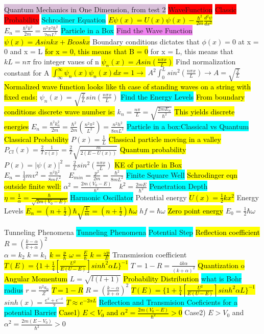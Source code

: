 \documentclass[6pt, oneside]{article}   	%
\begin{document}
\colorbox{Thistle}{Quantum Mechanics in One Dimension, from test 2}
\colorbox{Red}{WaveFunction}
\colorbox{Red}{Classic Probability}
\colorbox{Cyan}{Schrodiner Equation}
\hl{$E\psi(x) = U(x)\psi(x) - \frac{\hbar^2}{2m}\frac{d^2\psi}{dx^2}$}
$E_n = \frac{\hbar^2k^2}{2m} = \frac{n^2\pi^2\hbar^2}{2mL^2}$
\colorbox{Cyan}{Particle in a Box}
\colorbox{Violet}{Find the Wave Function}
\hl{$\psi(x) = Asinkx + B coskx$}
Boundary conditions dictates that $\phi(x) = 0$ at x = 0 and x = L
\hl{for x = 0, this means that B = 0}
for x = L, this means that $kL = n\pi$ fro integer vaues of n
\hl{$\psi_n(x) = A sin(\frac{n\pi x}{L})$}
Find normalization constant for A
\hl{$\int_{\infty}^{\infty} \psi_n(x)\psi_n(x)  dx = 1 \rightarrow $}
$A^2 \int_{0}^{L}  sin^2(\frac{n\pi x}{L}) \rightarrow A = \sqrt{\frac{2}{L}}$
\hl{Normalized wave function looks like th case of standing waves on a string with fixed ends:}
$\psi_n(x) = \sqrt{\frac{2}{L}} sin(\frac{n\pi x}{L})$
\colorbox{Cyan}{Find the Energy Levels}
\hl{From  boundary conditions discrete wave number is:}
$k_n = \frac{n\pi}{L}=\sqrt{\frac{2mE_n}{\hbar^2}}$
\hl{This yields discrete energies}
$E_n= \frac{\hbar^2 k_n^2}{2m} = \frac{\hbar^2}{2m}(\frac{n^2\pi^2}{L^2})=\frac{n^2h^2}{8mL^2}$
\colorbox{Cyan}{Particle in a box:Classical vs Quantum}
\hl{Classical Probability}
$P(x)=\frac{1}{L}$
\hl{Classical particle moving in a valley}
$P_{Cl}(x) = \frac{2}{T}\frac{1}{v(x)}=\frac{2}{T}\sqrt{\frac{m}{2(E-U(x))}}$
\hl{Quantum probability}
$P(x) = |\psi(x)|^2 = \frac{2}{L}sin^2(\frac{n\pi x}{L})$
\hl{KE of particle in Box}
$E_n = \frac{1}{2}mv^2 = \frac{n^2h^2}{8mL^2} \quad E_{min} = \frac{p^2}{2m} = \frac{\hbar^2}{8mL^2}$
\colorbox{Cyan}{Finite Square Well}
\hl{Schrodinger eqn outside finite well:}
$\alpha^2 = \frac{2m(V_0 - E)}{\hbar^2} \quad k^2 = \frac{2mE}{\hbar^2}$
\colorbox{Cyan}{Penetration Depth}
\hl{$\eta = \frac{1}{\alpha} = \frac{\hbar}{\sqrt{2m(V_0 - E)}}$}
\colorbox{Cyan}{Harmonic Oscillator}
Potential energy
\hl{$U(x) = \frac{1}{2}kx^2$}
Energy Levels
\hl{$E_n = (n+\frac{1}{2})\hbar \sqrt{\frac{k}{m}} = (n+\frac{1}{2})\hbar \omega$}
$hf = \hbar\omega$
\hl{Zero point energy}
$E_0 = \frac{1}{2}\hbar \omega$

\colorbox{BurntOrange}{Tunneling Phenomena}
\colorbox{Cyan}{Tunneling Phenomena}
\colorbox{Cyan}{Potential Step}
\hl{Reflection coefficient }
$R = (\frac{k-\alpha}{k+\alpha})^2$\\ $\alpha = k_2$ $k = k_1$
\hl{$k = \frac{p}{\hbar}$  $\omega = \frac{E}{\hbar}$ $k=\frac{\omega p}{E}$}
Transmission coefficient
\hl{$T(E)=\{1+\frac{1}{4}[\frac{U^2}{E(U-E)}]sinh^2\alpha L \}^{-1}$}
$T = 1-R = \frac{4k\alpha}{(k+\alpha)^2}$
\hl{Quantization o Angular Momentum}
$L=\sqrt{l(l+1)}$
\hl{Probability Distribution}
\colorbox{Cyan}{what is Bohr radius}
$r = \frac{n^2 a_0}{Z}$
\hl{$T = 1 - R$}
$R = (\frac{k-\alpha}{k+\alpha})^2$
\hl{$T(E)=\{1+\frac{1}{4}[\frac{U^2}{E(U-E)}]sinh^2\alpha L \}^{-1}$}
$sinh (x) = \frac{e^{x} + e^{-x}}{2}$
\hl{$T \approx e^{-2\alpha L}$}
\colorbox{Cyan}{Reflection and Transmision Coeficients for a potential Barrier}
\hl{Case1) $E<V_0$ and $\alpha^2 = \frac{2m(V_0-E)}{\hbar^2}> 0$}
Case2) $E>V_0$ and $\alpha^2 = \frac{2m(E-V_0)}{\hbar^2}> 0$
\end{document}
